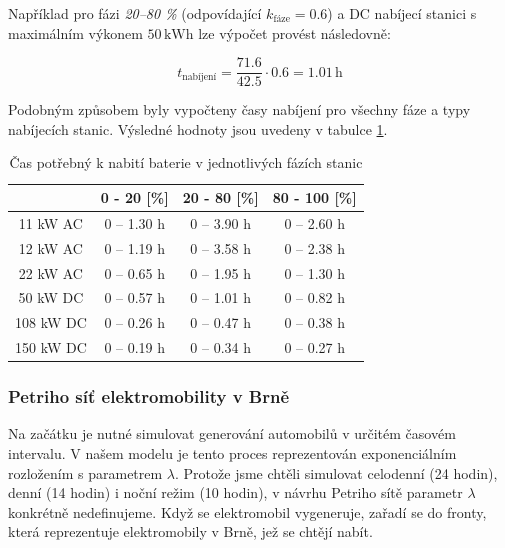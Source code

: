 \documentclass[a4paper,11pt]{article}
\begin{document}
Například pro fázi \textit{20–80 \%} (odpovídající \(k_{\text{fáze}} = 0.6\)) a DC nabíjecí stanici s maximálním výkonem \(50 \, \mathrm{kWh}\) lze výpočet provést následovně:

\[
t_{\text{nabíjení}} = \frac{71.6}{42.5} \cdot 0.6 = 1.01 \, \mathrm{h}
\]

Podobným způsobem byly vypočteny časy nabíjení pro všechny fáze a typy nabíjecích stanic. Výsledné hodnoty jsou uvedeny v tabulce \ref{table:charging-time-consumption}.


\begin{table}[H]
    \centering 
    \vspace{0.5cm} %
    \begin{tabular}{|c|c|c|c|}
        \hline
        \textbf{} & \textbf{0 - 20 [\%]} & \textbf{20 - 80 [\%]} & \textbf{80 - 100 [\%]}\\
        \hline
        11 kW AC  &  0 -- 1.30 h  & 0 -- 3.90 h & 0 -- 2.60 h  \\
        \hline
        12 kW AC  &  0 -- 1.19 h  & 0 -- 3.58 h & 0 -- 2.38 h  \\
        \hline
        22 kW AC  &  0 -- 0.65 h  & 0 -- 1.95 h & 0 -- 1.30 h  \\
        \hline
        50 kW DC  &  0 -- 0.57 h & 0 -- 1.01 h & 0 -- 0.82 h  \\
        \hline
        108 kW DC &  0 -- 0.26 h  & 0 -- 0.47 h & 0 -- 0.38 h  \\
        \hline
        150 kW DC &  0 -- 0.19 h  & 0 -- 0.34 h & 0 -- 0.27 h  \\
        \hline
    \end{tabular}
    \caption{Čas potřebný k nabití baterie v jednotlivých fázích stanic}
    \label{table:charging-time-consumption}
    \vspace{0.5cm} %
\end{table}


\subsubsection{Petriho síť elektromobility v Brně}

Na začátku je nutné simulovat generování automobilů v určitém časovém intervalu. V našem modelu je tento proces reprezentován exponenciálním rozložením s parametrem \(\lambda\). Protože jsme chtěli simulovat celodenní (24 hodin), denní (14 hodin) i noční režim (10 hodin), v návrhu Petriho sítě parametr \(\lambda\) konkrétně nedefinujeme. Když se elektromobil vygeneruje, zařadí se do fronty, která reprezentuje elektromobily v Brně, jež se chtějí nabít. 
\end{document}
